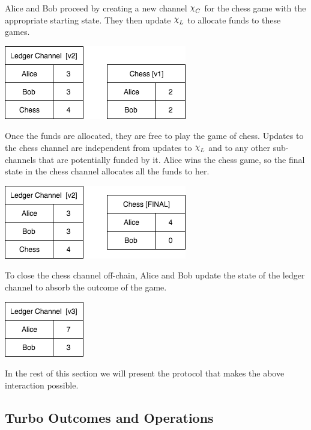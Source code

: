 \documentclass{article}
\DeclareRobustCommand{\rchi}{{\mathpalette\irchi\relax}}
\newcommand{\irchi}[2]{\raisebox{\depth}{$#1\chi$}} %
\theoremstyle{definition}
\begin{document}
Alice and Bob proceed by creating a new channel $\rchi_C$ for the chess game with the appropriate starting state.
They then update $\rchi_L$ to allocate funds to these games.

\begin{center}
  \includegraphics[scale=0.5]{turbo_open} %
\end{center}

Once the funds are allocated, they are free to play the game of chess.
Updates to the chess channel are independent from updates to $\rchi_L$ and to
any other sub-channels that are potentially funded by it. 
Alice wins the chess game, so the final state in the chess channel allocates all the
funds to her.

\begin{center}
  \includegraphics[scale=0.5]{turbo_close} %
\end{center}

To close the chess channel off-chain, Alice and Bob update the state of the ledger channel to absorb the outcome of the game.

\begin{center}
  \includegraphics[scale=0.5]{turbo_finish} %
\end{center}

In the rest of this section we will present the protocol that makes the above interaction
possible.

\subsection{Turbo Outcomes and Operations}
\end{document}
